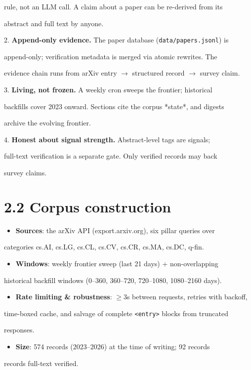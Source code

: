 \documentclass[11pt]{article}
\begin{document}
rule, not an LLM call. A claim about a paper can be re-derived from its

abstract and full text by anyone.

2. \textbf{Append-only evidence.} The paper database (\texttt{data/papers.jsonl}) is

append-only; verification metadata is merged via atomic rewrites. The

evidence chain runs from arXiv entry $\rightarrow$ structured record $\rightarrow$ survey claim.

3. \textbf{Living, not frozen.} A weekly cron sweeps the frontier; historical

backfills cover 2023 onward. Sections cite the corpus *state*, and digests

archive the evolving frontier.

4. \textbf{Honest about signal strength.} Abstract-level tags are signals;

full-text verification is a separate gate. Only verified records may back

survey claims.


\section{2.2 Corpus construction}

\begin{itemize}
\item \textbf{Sources}: the arXiv API (export.arxiv.org), six pillar queries over
\end{itemize}
categories cs.AI, cs.LG, cs.CL, cs.CV, cs.CR, cs.MA, cs.DC, q-fin.

\begin{itemize}
\item \textbf{Windows}: weekly frontier sweep (last 21 days) + non-overlapping
\end{itemize}
historical backfill windows (0--360, 360--720, 720--1080, 1080--2160 days).

\begin{itemize}
\item \textbf{Rate limiting \& robustness}: $\geq$3s between requests, retries with backoff,
\end{itemize}
time-boxed cache, and salvage of complete \texttt{<entry>} blocks from truncated

responses.

\begin{itemize}
\item \textbf{Size}: 574 records (2023--2026) at the time of writing; 92 records
\end{itemize}
records full-text verified.
\end{document}
